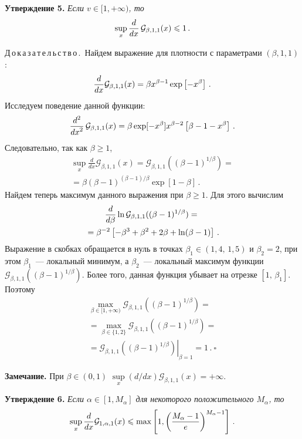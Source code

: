 \begin{multicols}{2}
\medskip

\noindent
\textbf{Утверждение 5.}
\textit{Если $v\in[1,+\infty)$, то}
$$
\sup\limits_x \displaystyle\frac{\displaystyle d\mathstrut}{\displaystyle dx\mathstrut}\,{\mathcal G}_{\beta,1,1}(x) \leqslant 1\,.
$$


\smallskip

\noindent
Д\,о\,к\,а\,з\,а\,т\,е\,л\,ь\,с\,т\,в\,о\,.\
Найдем выражение для плотности с параметрами $(\beta,1,1)$:
$$
\displaystyle\frac{\displaystyle d\mathstrut}{\displaystyle dx\mathstrut}{\mathcal G}_{\beta,1,1}(x) = \beta x^{\beta-1}\exp
\left[-x^{\beta}\right]\,.
$$
Исследуем поведение данной функции:
$$
\displaystyle\frac{\displaystyle d^2\mathstrut}{\displaystyle dx^2\mathstrut}\,{\mathcal G}_{\beta,1,1}(x) =
\beta\exp[-x^{\beta}]x^{\beta-2}\left[\beta-1-x^{\beta}\right]\,.
$$
Следовательно, так как $\beta\geqslant1$,
\begin{multline*}
\sup\limits_x \frac{d}{dx}{\mathcal G}_{\beta,1,1}(x) = {\mathcal
G}_{\beta,1,1}( (\beta-1)^{{1}/{\beta}} ) ={}\\
{}=
\beta(\beta-1)^{(\beta-1)/\beta}\exp[1-\beta]\,.
\end{multline*}
Найдем теперь максимум данного выражения при $\beta\geqslant1$.
Для этого вычислим
\begin{multline*}
\displaystyle\frac{\displaystyle d\mathstrut}{\displaystyle d\beta\mathstrut} \ln {\mathcal
G}_{\beta,1,1}((\beta-1)^{{1}/{\beta}}) ={}\\
{}=
\beta^{-2}\left[-\beta^3 + \beta^2 + 2\beta + \ln(\beta-1)\right]\,.
\end{multline*}
Выражение в скобках обращается в нуль в точках
$\beta_1\in(1{,}4,\,1{,}5)$ и $\beta_2=2$, при этом $\beta_1$~---
локальный минимум, а $\beta_2$~--- локальный максимум функции
${\mathcal G}_{\beta,1,1}( (\beta-1)^{1/\beta} )$. Более
того, данная функция убывает на отрезке $[1,\,\beta_1]$. Поэтому
\begin{multline*}
\max\limits_{\beta\in[1,+\infty)} {\mathcal
G}_{\beta,1,1}((\beta-1)^{{1}/{\beta}}) ={}\\
{}=
\max\limits_{\beta\in\{1,2\}} {\mathcal
G}_{\beta,1,1}((\beta-1)^{{1}/{\beta}}) ={}\\
{}= \left.{\mathcal
G}_{\beta,1,1}((\beta-1)^{{1}/{\beta}})\right|_{\beta=1} = 1\,.~\square
\end{multline*}


\noindent
\textbf{Замечание.}
При $\beta\in(0,1)$ $\sup\limits_x (d/dx){\mathcal
G}_{\beta,1,1}(x) = +\infty$.

\smallskip

\medskip

\noindent
\textbf{Утверждение 6.}
\textit{Если $\alpha\in[1,M_{\alpha}]$ для некоторого положительного
$M_{\alpha}$, то}
$$
\sup\limits_x \frac{d}{dx}{\mathcal G}_{1,\alpha,1}(x) \leqslant
\max\left[ 1,
\left(\displaystyle\frac{\displaystyle M_{\alpha}-1\mathstrut}{\displaystyle e\mathstrut}\right)^{M_{\alpha}-1}\right]\,.
$$


\end{multicols}
